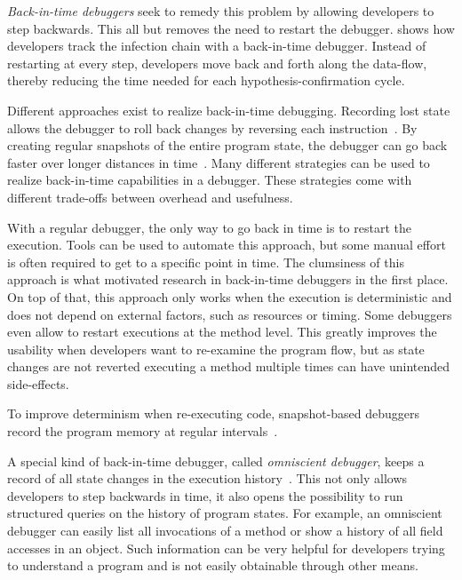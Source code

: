 \emph{Back-in-time debuggers} seek to remedy this problem by allowing developers to step backwards.
This all but removes the need to restart the debugger.
 shows how developers track the infection chain with a back-in-time debugger.
Instead of restarting at every step, developers move back and forth along the data-flow, thereby reducing the time needed for each hypothesis-confirmation cycle.

Different approaches exist to realize back-in-time debugging.
Recording lost state allows the debugger to roll back changes by reversing each instruction~\cite{feldman88:igor_a_system,cook02:reverse_execution_of_java,lieberman95:zstep_95_a_reversible}.
By creating regular snapshots of the entire program state, the debugger can go back faster over longer distances in time~\cite{boothe00:efficient_algorithms_for_bidirectional,tolmach93:a_debugger_for_standard}.
Many different strategies can be used to realize back-in-time capabilities in a debugger.
These strategies come with different trade-offs between overhead and usefulness.

With a regular debugger, the only way to go back in time is to restart the execution.
Tools can be used to automate this approach, but some manual effort is often required to get to a specific point in time.
The clumsiness of this approach is what motivated research in back-in-time debuggers in the first place.
On top of that, this approach only works when the execution is deterministic and does not depend on external factors, such as resources or timing.
Some debuggers even allow to restart executions at the method level.
This greatly improves the usability when developers want to re-examine the program flow, but as state changes are not reverted executing a method multiple times can have unintended side-effects.

To improve determinism when re-executing code, snapshot-based debuggers record the program memory at regular intervals~\cite{feldman88:igor_a_system, boothe00:efficient_algorithms_for_bidirectional}.

A special kind of back-in-time debugger, called \emph{omniscient debugger}, keeps a record of all state changes in the execution history~\cite{lewis03:debugging_backwards_in_time}.
This not only allows developers to step backwards in time, it also opens the possibility to run structured queries on the history of program states.
For example, an omniscient debugger can easily list all invocations of a method or show a history of all field accesses in an object.
Such information can be very helpful for developers trying to understand a program and is not easily obtainable through other means.

